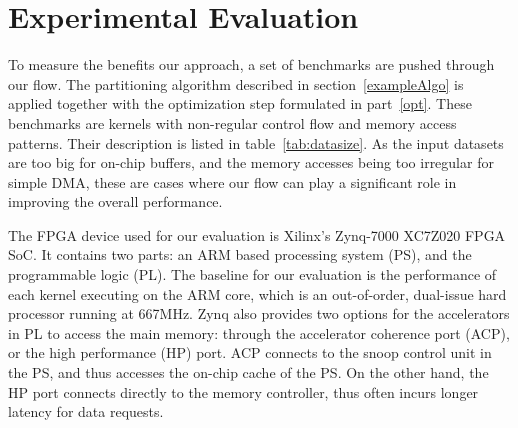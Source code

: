 \documentclass{sig-alternate}
\begin{document}
\begin{algorithm}[t]
\begin{algorithmic}[1]
  
  
  \end{algorithmic}
\end{algorithm}

\section{Experimental Evaluation}
\label{expEval}
To measure the benefits our approach, a set of benchmarks are pushed through our flow. The partitioning algorithm described in section~\ref{exampleAlgo} is applied together with the optimization step formulated in part~\ref{opt}. These benchmarks are kernels with non-regular control flow and memory access patterns. Their description is listed in table~\ref{tab:datasize}. 
As the input datasets are too big for on-chip buffers, and the memory accesses
being too irregular for simple DMA, these are cases where our flow can play a significant role
in improving the overall performance.







The FPGA device used for our evaluation is Xilinx's Zynq-7000 XC7Z020 FPGA
SoC. It contains two parts: an ARM based processing
system (PS), and the programmable logic (PL). 
The baseline for our evaluation is the performance of each kernel executing
on the ARM core, which is an out-of-order, dual-issue hard processor running at 667MHz. Zynq also provides two
options for the accelerators in PL to access the main memory: 
through the accelerator coherence port (ACP), or the high performance (HP) port. 
ACP connects to the snoop control unit in the PS, and 
thus accesses the on-chip cache of the PS. On the other hand, the HP port connects
directly to the memory controller, thus often incurs longer latency
for data requests.
\end{document}
